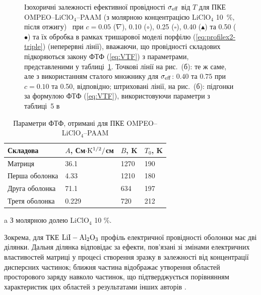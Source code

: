 \documentclass[14pt,twoside]{vakthesis}
\begin{document}
\begin{figure}[tb]
\begin{subfigure}[c]{0.48\textwidth}
		\caption{} \label{fig:OMPEO-LiClO4-TempDependence-b}
	\end{subfigure}
	\caption{\label{fig:OMPEO-LiClO4-TempDependence}
		Ізохоричні залежності ефективної провідності $\sigma_{\rm eff}$ від $T$ для ПКЕ OMPEO--LiClO$_4$--PAAM (з молярною концентрацією LiClO$_4$ 10~\%, після отжигу)~\cite{Wiec1994} при $c=0.05$ ($\nabla$), 0.10 ($\circ$), 0.25 ($\square$), 0.40 ($\blacktriangle$) та 0.50 ($\bullet$) та їх обробка в рамках тришарової моделі порфілю (\ref{eq:profilex2-triple})  (неперервні лінії), вважаючи, що провідності складових
		підкоряються закону ФТФ (\ref{eq:VTF}) з параметрами, представленими у таблиці~\ref{tab:temp}. Точкові лінії на рис.~(б): те ж саме, але з використанням сталого множнику для $\sigma_{\rm eff}$: $0.40$ та $0.75$ при $c=0.10$ та 0.50, відповідно; штриховані лінії, на рис.~(б): підгонки за формулою ФТФ (\ref{eq:VTF}), використовуючи параметри з таблиці~5 в \cite{Wiec1994}}
\end{figure}



\begin{table}[tb]
	\centering
	\caption{\label{tab:temp} Параметри ФТФ, 
		отримані для ПКЕ OMPEO--LiClO$_4$--PAAM }
	\begin{threeparttable} 
		\begin{tabular}{|l|l|l|l|}
			\hline
			\textrm{Складова}   & $A$, См$\cdot \rm{K}^{1/2}/$см & $B$, K & $T_0$, K  \\
			\hline
			Матриця \tnote{a}          &  36.1  &  1270  &  190   \\
			Перша оболонка   &  4.33  &  1210   &  180    \\
			Друга оболонка  &  71.1   &  634     &  197   \\
			Третя оболонка   & 0.229   &  720   &  212 \\
			\hline
		\end{tabular}
		\begin{tablenotes}
			\item[a] З молярною долею LiClO$_4$ 10 \%.
		\end{tablenotes}
	\end{threeparttable}
\end{table}

Зокрема, для ТКЕ $\rm LiI-Al_2O_3$ профіль електричної провідності оболонки має дві ділянки. Дальня ділянка відповідає за ефекти, пов'язані зі змінами електричних властивостей матриці у процесі створення зразку в залежності від концентрації дисперсних частинок; ближня частина відображає утворення областей просторового заряду навколо частинок, що підтверджується порівнянням характеристик цих областей з результатами інших авторів \cite{Jiang1995a, Jiang1995b}.
\end{document}
